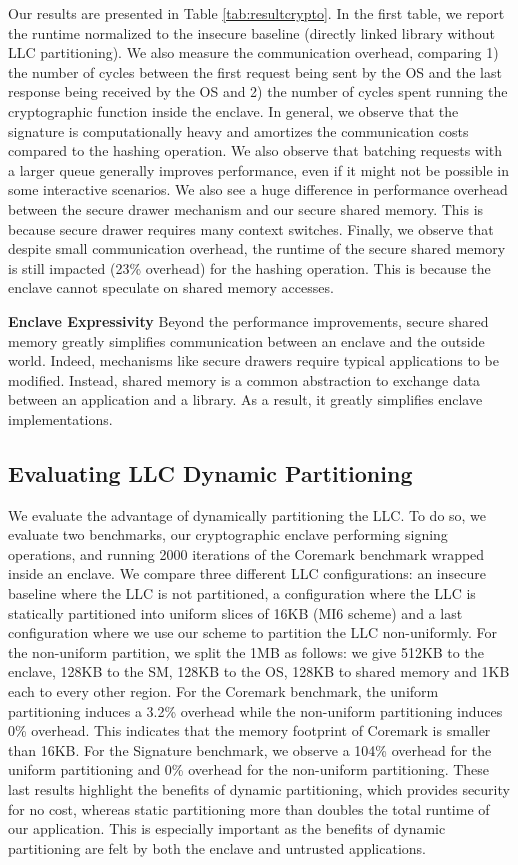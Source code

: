 Our results are presented in Table \ref{tab:resultcrypto}.
In the first table, we report the runtime normalized to the insecure baseline (directly linked library without LLC partitioning).
We also measure the communication overhead, comparing 1) the number of cycles between the first request being sent by the OS and the last response being received by the OS and 2) the number of cycles spent running the cryptographic function inside the enclave.
In general, we observe that the signature is computationally heavy and amortizes the communication costs compared to the hashing operation.
We also observe that batching requests with a larger queue generally improves performance, even if it might not be possible in some interactive scenarios.
We also see a huge difference in performance overhead between the secure drawer mechanism and our secure shared memory.
This is because secure drawer requires many context switches.
Finally, we observe that despite small communication overhead, the runtime of the secure shared memory is still impacted (23\% overhead) for the hashing operation. This is because the enclave cannot speculate on shared memory accesses.

\textbf{Enclave Expressivity}
Beyond the performance improvements, secure shared memory greatly simplifies communication between an enclave and the outside world.
Indeed, mechanisms like secure drawers require typical applications to be modified.
Instead, shared memory is a common abstraction to exchange data between an application and a library.
As a result, it greatly simplifies enclave implementations.


\subsection{Evaluating LLC Dynamic Partitioning}

We evaluate the advantage of dynamically partitioning the LLC. To do so, we evaluate two benchmarks, our cryptographic enclave performing signing operations, and running 2000 iterations of the Coremark \cite{gal2012exploring} benchmark wrapped inside an enclave.
We compare three different LLC configurations:
an insecure baseline where the LLC is not partitioned, a configuration where the LLC is statically partitioned into uniform slices of 16KB (MI6 scheme) and a last configuration where we use our scheme to partition the LLC non-uniformly.
For the non-uniform partition, we split the 1MB as follows: we give 512KB to the enclave, 128KB to the SM, 128KB to the OS, 128KB to shared memory and 1KB each to every other region.
For the Coremark benchmark, the uniform partitioning induces a 3.2\% overhead while the non-uniform partitioning induces 0\% overhead. 
This indicates that the memory footprint of Coremark is smaller than 16KB.
For the Signature benchmark, we observe a 104\% overhead for the uniform partitioning and 0\% overhead for the non-uniform partitioning.
These last results highlight the benefits of dynamic partitioning, which provides security for no cost, whereas static partitioning more than doubles the total runtime of our application.
This is especially important as the benefits of dynamic partitioning are felt by both the enclave and untrusted applications.


